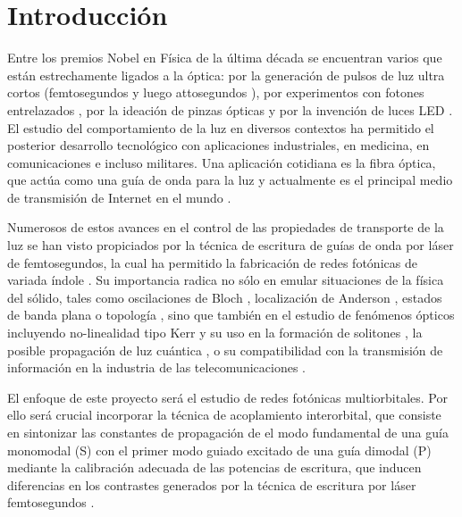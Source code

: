 \chapter{Introducción}
Entre los premios Nobel en Física de la última década \cite{nobel} se encuentran varios que están estrechamente ligados a la óptica: por la generación de pulsos de luz ultra cortos (femtosegundos \cite{femto1} y luego attosegundos \cite{atto1, atto2, atto3}), por experimentos con fotones entrelazados \cite{photons1, photons2, photons3}, por la ideación de pinzas ópticas \cite{opticaltweezers} y por la invención de luces LED \cite{led1, led2, led3}. El estudio del comportamiento de la luz en diversos contextos ha permitido el posterior desarrollo tecnológico con aplicaciones industriales, en medicina, en comunicaciones e incluso militares. Una aplicación cotidiana es la fibra óptica, que actúa como una guía de onda para la luz y actualmente es el principal medio de transmisión de Internet en el mundo \cite{fibra2, fibra}. 
	
	Numerosos de estos avances en el control de las propiedades de transporte de la luz se han visto propiciados por la técnica de escritura de guías de onda por láser de femtosegundos, la cual ha permitido la fabricación de redes fotónicas de variada índole \cite{femto, bics, lieb1, lieb2, artificialFB, FBdynamics, strain, dendritas, splitters}. Su importancia radica no sólo en emular situaciones de la física del sólido, tales como oscilaciones de Bloch \cite{BlochOsci}, localización de Anderson \cite{Anderson}, estados de banda plana \cite{lieb1, lieb2, artificialFB, FBdynamics} o topología \cite{obstopo, obsfloquet, topo1dphoto,toporusos}, sino que también en el estudio de fenómenos ópticos incluyendo no-linealidad tipo Kerr y su uso en la formación de solitones \cite{discretesolitons}, la posible propagación de luz cuántica \cite{qed, squeezed, topoquantum}, o su compatibilidad con la transmisión de información en la industria de las telecomunicaciones \cite{telecom}.
	
	El enfoque de este proyecto será el estudio de redes fotónicas multiorbitales. Por ello será crucial incorporar la técnica de acoplamiento interorbital, que consiste en sintonizar las constantes de propagación de el modo fundamental de una guía monomodal (S) con el primer modo guiado excitado de una guía dimodal (P) mediante la calibración adecuada de las potencias de escritura, que inducen diferencias en los contrastes generados por la técnica de escritura por láser femtosegundos \cite{interorbital}.
	
